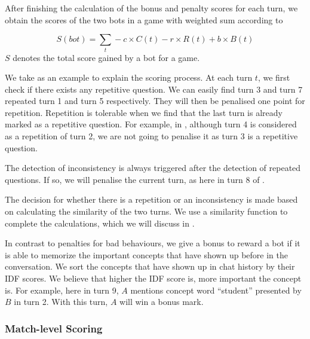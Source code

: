After finishing the calculation of the bonus and penalty scores for each turn, we obtain the scores of the two bots in a game with weighted sum according to 

\begin{equation}
S(bot) = \sum_t - c\times C(t)  - r \times R(t) + b \times B(t)
\label{eq:sum-up}
\end{equation}
$S$ denotes the total score gained by a bot for a game.

We take  as an example to explain the scoring process. 
At each turn $t$, we first check if there exists any repetitive question.  
We can easily find turn 3 and turn 7 repeated turn 1 and turn 5 
respectively. They will then be penalised one point for repetition. 
Repetition is tolerable when we find that the last turn is already 
marked as a repetitive question. For example, in , 
although turn 4 is considered as a repetition of turn 2,  we are not going to penalise it as turn 3 is a repetitive question. 

The detection of inconsistency is always triggered after the detection of repeated questions. If so, we will penalise the current turn, as here in turn 8 of .

The decision for whether there is a repetition or an inconsistency is made based on calculating the similarity of the two turns. We use a similarity function to complete the calculations, which we will discuss in . 

In contrast to penalties for bad behaviours, we give a bonus to reward
a bot if it is able to memorize the important concepts that have shown up 
before in the conversation. We sort the concepts that have shown up in 
chat history by their IDF scores. We believe that higher the IDF score is,  
more important the concept is. For example, here in turn 9, $A$ 
mentions concept word ``student'' presented by $B$ in turn 2. With this
turn, $A$ will win a bonus mark.

\subsubsection*{Match-level Scoring}


